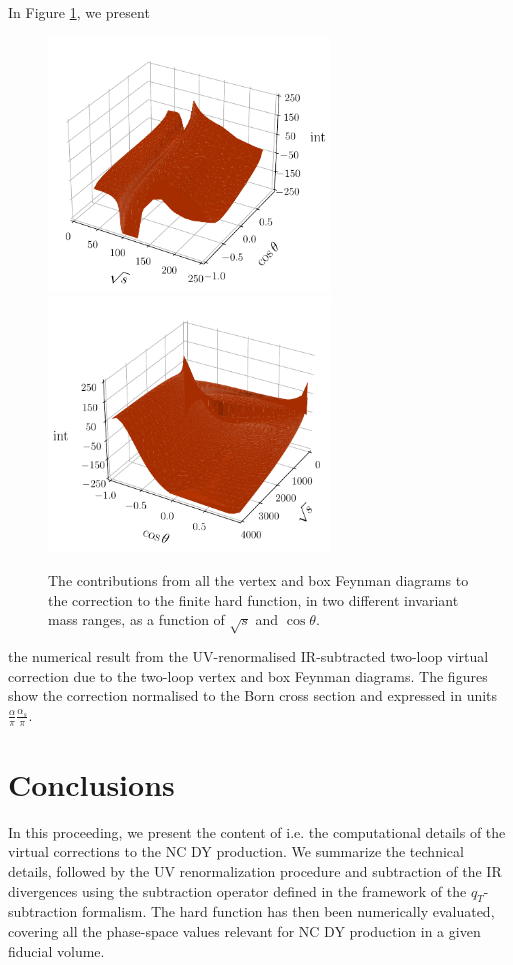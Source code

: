 \documentclass[a4paper]{jpconf}
\begin{document}
In Figure \ref{fig:correction}, we present
\begin{figure}[t]
\begin{center}
\includegraphics[width=7.5cm]{plots/correction-VB-noFSR-250.pdf}
\includegraphics[width=7.5cm]{plots/correction-VB-noFSR-extended.pdf}
\end{center}
\vspace{-2ex}
\caption{\label{fig:correction}
 The contributions from all the vertex and box Feynman diagrams
 to the \oaas correction to the finite hard function,
  in two different invariant mass ranges,
  as a function of $\sqrt{s}$ and $\cos\theta$.
  }
\end{figure}
the numerical result from the UV-renormalised IR-subtracted
two-loop \oaas virtual correction due to the two-loop vertex and box Feynman diagrams.
% 
The figures show the correction normalised to the Born cross section
and expressed in units $\frac{\alpha}{\pi} \frac{\alpha_s}{\pi}$.

\section{Conclusions}
\label{sec:conclusions}
% 
In this proceeding, we present the content of \cite{Armadillo:2022bgm} i.e.
% 
the computational details of the \oaas virtual corrections to the NC DY production.
We summarize the technical details, followed by the UV renormalization procedure
and subtraction of the IR divergences using the subtraction operator defined 
in the framework of the $q_T$-subtraction formalism. The hard function has then 
been numerically evaluated, covering all the phase-space values relevant for NC
DY production in a given fiducial volume.
\end{document}
